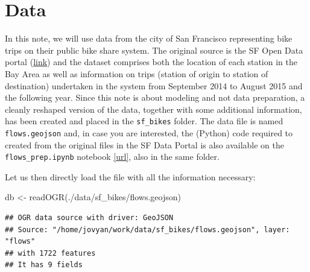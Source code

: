 \documentclass[
]{book}
\newenvironment{Shaded}{\begin{snugshade}}{\end{snugshade}}
\newcommand{\ConstantTok}[1]{\textcolor[rgb]{0.00,0.00,0.00}{#1}}
\newcommand{\FunctionTok}[1]{\textcolor[rgb]{0.00,0.00,0.00}{#1}}
\newcommand{\NormalTok}[1]{#1}
\newcommand{\OtherTok}[1]{\textcolor[rgb]{0.56,0.35,0.01}{#1}}
\newcommand{\SpecialCharTok}[1]{\textcolor[rgb]{0.00,0.00,0.00}{#1}}
\newcommand{\StringTok}[1]{\textcolor[rgb]{0.31,0.60,0.02}{#1}}
\begin{document}
\hypertarget{data-1}{%
\section{Data}\label{data-1}}

In this note, we will use data from the city of San Francisco representing bike trips on their public bike share system. The original source is the SF Open Data portal (\href{http://www.bayareabikeshare.com/open-data}{link}) and the dataset comprises both the location of each station in the Bay Area as well as information on trips (station of origin to station of destination) undertaken in the system from September 2014 to August 2015 and the following year. Since this note is about modeling and not data preparation, a cleanly reshaped version of the data, together with some additional information, has been created and placed in the \texttt{sf\_bikes} folder. The data file is named \texttt{flows.geojson} and, in case you are interested, the (Python) code required to created from the original files in the SF Data Portal is also available on the \texttt{flows\_prep.ipynb} notebook \href{https://github.com/darribas/spa_notes/blob/master/sf_bikes/flows_prep.ipynb}{{[}url{]}}, also in the same folder.

Let us then directly load the file with all the information necessary:

\begin{Shaded}
\begin{Highlighting}[]
\NormalTok{db }\OtherTok{\textless{}{-}} \FunctionTok{readOGR}\NormalTok{(}\StringTok{\textquotesingle{}./data/sf\_bikes/flows.geojson\textquotesingle{}}\NormalTok{)}
\end{Highlighting}
\end{Shaded}

\begin{verbatim}
## OGR data source with driver: GeoJSON 
## Source: "/home/jovyan/work/data/sf_bikes/flows.geojson", layer: "flows"
## with 1722 features
## It has 9 fields
\end{verbatim}

\begin{Shaded}
\end{Shaded}
\end{document}

